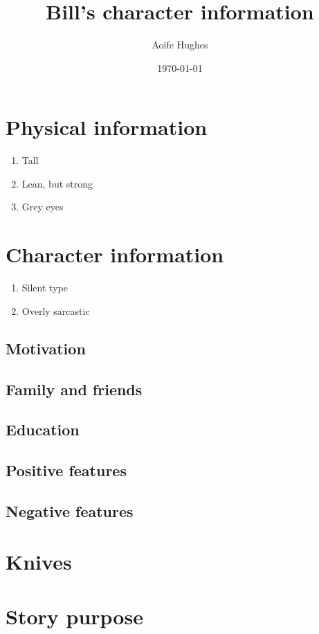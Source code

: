 \documentclass[11pt]{article}
\title{Bill's character information}
\author{Aoife Hughes}
\date{\today}
\begin{document}
\maketitle	
\pagebreak


\section{Physical information}

\begin{enumerate}
    \item Tall 
    \item Lean, but strong
    \item Grey eyes
 
\end{enumerate}

\section{Character information}

\begin{enumerate}
    \item Silent type 
    \item Overly sarcastic
\end{enumerate}

\subsection{Motivation}

\subsection{Family and friends}

\subsection{Education}

\subsection{Positive features}

\subsection{Negative features}

\section{Knives}



\section{Story purpose}
\end{document}
